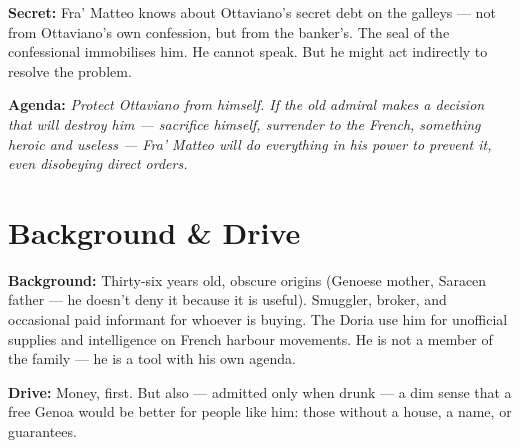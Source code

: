 \clearpage

\begin{secretbox}
  \textbf{Secret:} Fra' Matteo knows about Ottaviano's secret debt on the galleys ---
  not from Ottaviano's own confession, but from the banker's. The seal of the
  confessional immobilises him. He cannot speak. But he might act indirectly
  to resolve the problem.

  \medskip\noindent\textcolor{SecretRed}{\textbf{Agenda:}}
  \textit{Protect Ottaviano from himself. If the old admiral makes a decision that
  will destroy him --- sacrifice himself, surrender to the French, something
  heroic and useless --- Fra' Matteo will do everything in his power to prevent
  it, even disobeying direct orders.}
\end{secretbox}

\clearpage



\section*{Background \& Drive}
\begin{rulebox}{}
  \textbf{Background:} Thirty-six years old, obscure origins (Genoese mother, Saracen
  father --- he doesn't deny it because it is useful). Smuggler, broker, and occasional
  paid informant for whoever is buying. The Doria use him for unofficial supplies and
  intelligence on French harbour movements. He is not a member of the family ---
  he is a tool with his own agenda.

  \medskip\noindent\textcolor{DoriaBlue}{\textbf{Drive:}} Money, first. But also ---
  admitted only when drunk --- a dim sense that a free Genoa would be better for
  people like him: those without a house, a name, or guarantees.
\end{rulebox}

